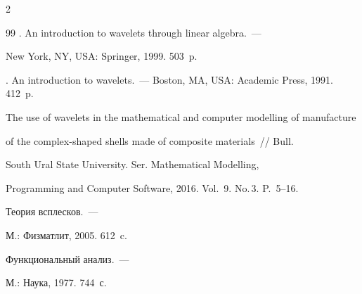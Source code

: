\begin{multicols}{2}
{{\begin{thebibliography}{99}
. An introduction to wavelets through linear algebra.~--- 


New York, NY, USA: Springer,  1999.  503~p.




.  An introduction to wavelets.~--- Boston, MA, USA: Academic Press, 1991. 412~p.






The use of wavelets in the mathematical and computer modelling of manufacture 


of the complex-shaped shells made of composite materials~//  Bull. 


South Ural State University. Ser. Mathematical Modelling, 


Programming and Computer Software, 2016. Vol.~9. No.\,3. P.~5--16.







 Теория всплесков.~--- 


М.: Физматлит, 2005.  612~c.




 Функциональный анализ.~--- 


М.: Наука, 1977. 744~с.













 \end{thebibliography}





 }


 }





\end{multicols}





